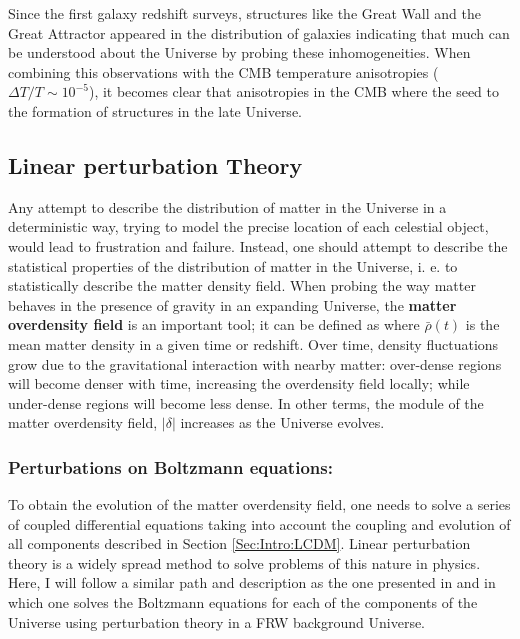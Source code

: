 \qquad Since the first galaxy redshift surveys, structures like the Great Wall \citep{SloanGreatWall} and the Great Attractor \citep{ScharfLahav1992} appeared in the distribution of galaxies indicating that much can be understood about the Universe by probing these inhomogeneities. When combining this observations with the CMB temperature anisotropies ($\Delta T/T \sim 10^{-5}$), it becomes clear that anisotropies in the CMB where the seed to the formation of structures in the late Universe. 

\subsection{Linear perturbation Theory}\label{Sec:Intro:LinTheory}
Any attempt to describe the distribution of matter in the Universe in a deterministic way, trying to model the precise location of each celestial object, would lead to frustration and failure. Instead, one should attempt to describe the statistical properties of the distribution of matter in the Universe, i. e. to statistically describe the matter density field. When probing the way matter behaves in the presence of gravity in an expanding Universe, the \textbf{matter overdensity field} is an important tool;  it can be defined as
where $\bar{\rho}(t)$ is the mean matter density in a given time or redshift. Over time, density fluctuations grow due to the gravitational interaction with nearby matter: over-dense regions will become denser with time, increasing the overdensity field locally; while under-dense regions will become less dense. In other terms, the module of the matter overdensity field, $| \delta |$ increases as the Universe evolves.

\subsubsection{Perturbations on Boltzmann equations:}
To obtain the evolution of the matter overdensity field, one needs to solve a series of coupled differential equations taking into account the coupling and evolution of all components described in Section \ref{Sec:Intro:LCDM}. Linear perturbation theory is a widely spread method to solve problems of this nature in physics. Here, I will follow a similar path and description as the one presented in \cite{Peacock} and \cite{dods} in which one solves the Boltzmann equations for each of the components of the Universe using perturbation theory in a FRW background Universe. 

